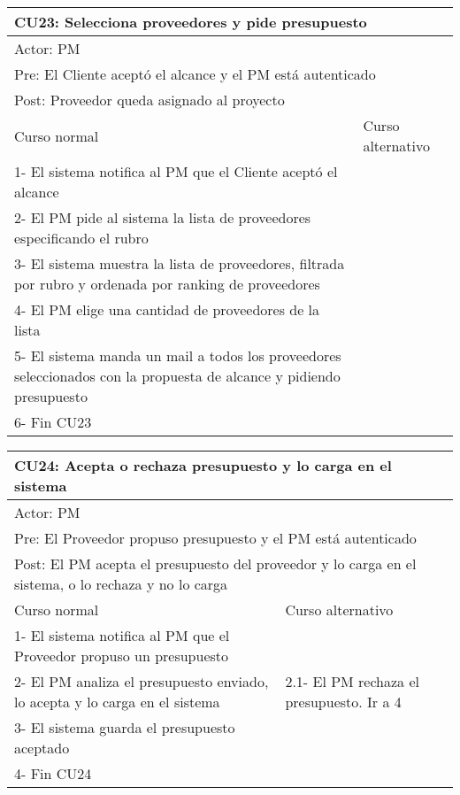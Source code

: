 \begin{table}[H]
  \begin{adjustbox}{max width = \textwidth}
  \begin{tabular}{|l|l|}
    \hline
    \multicolumn{2}{|l|}{CU23: Selecciona proveedores y pide presupuesto} \\\hline
    \multicolumn{2}{|l|}{Actor: PM} \\\hline
    \multicolumn{2}{|l|}{Pre: El Cliente aceptó el alcance y el PM está autenticado} \\\hline
    \multicolumn{2}{|l|}{Post: Proveedor queda asignado al proyecto} \\\hline
     Curso normal & Curso alternativo\\ \hline
     1- El sistema notifica al PM que el Cliente aceptó el alcance & \\ \hline
     2- El PM pide al sistema la lista de proveedores especificando el rubro & \\ \hline
     3- El sistema muestra la lista de proveedores, filtrada por rubro y ordenada por ranking de proveedores & \\ \hline
     4- El PM elige una cantidad de proveedores de la lista & \\ \hline
     5- El sistema manda un mail a todos los proveedores seleccionados con la propuesta de alcance y pidiendo presupuesto & \\ \hline
     6- Fin CU23 & \\ \hline
 \end{tabular}
  \end{adjustbox}
\end{table}


\begin{table}[H]
  \begin{adjustbox}{max width = \textwidth}
  \begin{tabular}{|l|l|}
    \hline
    \multicolumn{2}{|l|}{CU24: Acepta o rechaza presupuesto y lo carga en el sistema} \\\hline
    \multicolumn{2}{|l|}{Actor: PM} \\\hline
    \multicolumn{2}{|l|}{Pre: El Proveedor propuso presupuesto y el PM está autenticado} \\\hline
    \multicolumn{2}{|l|}{Post: El PM acepta el presupuesto del proveedor y lo carga en el sistema, o lo rechaza y no lo carga} \\\hline
     Curso normal & Curso alternativo\\ \hline
     1- El sistema notifica al PM que el Proveedor propuso un presupuesto & \\ \hline
     2- El PM analiza el presupuesto enviado, lo acepta y lo carga en el sistema & 2.1- El PM rechaza el presupuesto. Ir a 4 \\ \hline
     3- El sistema guarda el presupuesto aceptado & \\ \hline
     4- Fin CU24 & \\ \hline
 \end{tabular}
  \end{adjustbox}
\end{table}

